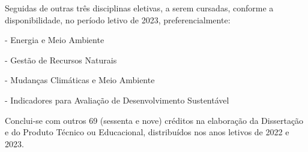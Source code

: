 \documentclass[
   article,       %
   12pt,          %
   oneside,       %
   a4paper,       %
   english,       %
   brazil,           %
   sumario=tradicional
   ]{abntex2}
\begin{document}
Seguidas de outras três disciplinas eletivas, a serem cursadas, conforme a disponibilidade, no período letivo de 2023, preferencialmente:

\begin{description}[font=$\bullet$~\normalfont\scshape]
\item [DCI4011] - Energia e Meio Ambiente
\item [DCI4013] - Gestão de Recursos Naturais
\item [DCI4017] - Mudanças Climáticas e Meio Ambiente
\item [DCI4015] - Indicadores para Avaliação de Desenvolvimento Sustentável
\end{description}

Conclui-se com outros 69 (sessenta e nove) créditos na elaboração da Dissertação e do Produto Técnico ou Educacional, distribuídos nos anos letivos de 2022 e 2023.

\postextual


\end{document}
